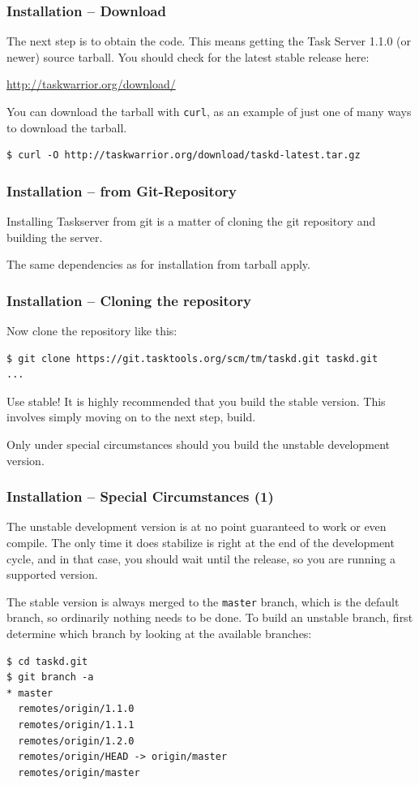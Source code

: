 \documentclass[t,handout]{beamer}
\begin{document}
\begin{frame}[fragile]\frametitle{Installation -- Download}
    The next step is to obtain the code. This means getting the Task Server 1.1.0 (or newer) source tarball.  You should check for the latest stable release here:

    \href{http://taskwarrior.org/download/}{http://taskwarrior.org/download/}

    \vfill
    You can download the tarball with \verb+curl+, as an example of just one of many ways to download the tarball.

    \begin{lstlisting}
$ curl -O http://taskwarrior.org/download/taskd-latest.tar.gz\end{lstlisting}
\end{frame}

\begin{frame}[fragile]\frametitle{Installation -- from Git-Repository}
    \vfill
    Installing Taskserver from git is a matter of cloning the git repository and building the server.

    The same dependencies as for installation from tarball apply.
\end{frame}

\begin{frame}[fragile]\frametitle{Installation -- Cloning the repository}
    Now clone the repository like this:

    \begin{lstlisting}
$ git clone https://git.tasktools.org/scm/tm/taskd.git taskd.git
...\end{lstlisting}

    \vfill
    \begin{alertblock}{Use stable!}
        It is highly recommended that you build the stable version. This involves simply moving on to the next step, build.

        Only under special circumstances should you build the unstable development version.
    \end{alertblock}
\end{frame}

\begin{frame}[fragile]\frametitle{Installation -- Special Circumstances (1)}
    \vfill
    The unstable development version is at no point guaranteed to work or even compile. The only time it does stabilize is right at the end of the development cycle, and in that case, you should wait until the release, so you are running a supported version.

    The stable version is always merged to the \verb+master+ branch, which is the default branch, so ordinarily nothing needs to be done. To build an unstable branch, first determine which branch by looking at the available branches:

    \begin{lstlisting}
$ cd taskd.git
$ git branch -a
* master
  remotes/origin/1.1.0
  remotes/origin/1.1.1
  remotes/origin/1.2.0
  remotes/origin/HEAD -> origin/master
  remotes/origin/master\end{lstlisting}
\end{frame}
\end{document}
